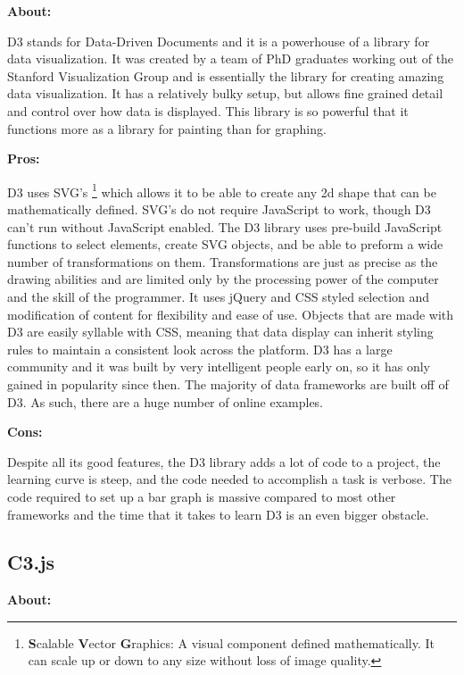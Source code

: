 \documentclass[draftclsnofoot,onecolumn,letterpaper,10pt,compsoc]{IEEEtran}
\begin{document}
    \textbf{About:}

    D3 stands for Data-Driven Documents and it is a powerhouse of a library for data visualization.\cite{d3.org}
    It was created by a team of PhD graduates working out of the Stanford Visualization Group and is essentially the library for creating amazing data visualization.\cite{d3Journal}
    It has a relatively bulky setup, but allows fine grained detail and control over how data is displayed.
    This library is so powerful that it functions more as a library for painting than for graphing.

    \noindent \textbf{Pros:}

    D3 uses SVG's \footnote{\textbf{S}calable \textbf{V}ector \textbf{G}raphics: A visual component defined mathematically. It can scale up or down to any size without loss of image quality.} which allows it to be able to create any 2d shape that can be mathematically defined.
    SVG's do not require JavaScript to work, though D3 can't run without JavaScript enabled.
    The D3 library uses pre-build JavaScript functions to select elements, create SVG objects, and be able to preform a wide number of transformations on them.\cite{d3.org}
    Transformations are just as precise as the drawing abilities and are limited only by the processing power of the computer and the skill of the programmer.
    It uses jQuery and CSS styled selection and modification of content for flexibility and ease of use.
    Objects that are made with D3 are easily syllable with CSS, meaning that data display can inherit styling rules to maintain a consistent look across the platform.
    D3 has a large community and it was built by very intelligent people early on, so it has only gained in popularity since then.\cite{DataVisProCon}
    The majority of data frameworks are built off of D3.
    As such, there are a huge number of online examples.

    \noindent \textbf{Cons:}

    Despite all its good features, the D3 library adds a lot of code to a project, the learning curve is steep, and the code needed to accomplish a task is verbose.\cite{DataVisProCon}
    The code required to set up a bar graph is massive compared to most other frameworks and the time that it takes to learn D3 is an even bigger obstacle.

  \subsection{C3.js}
    \textbf{About:}
\end{document}
